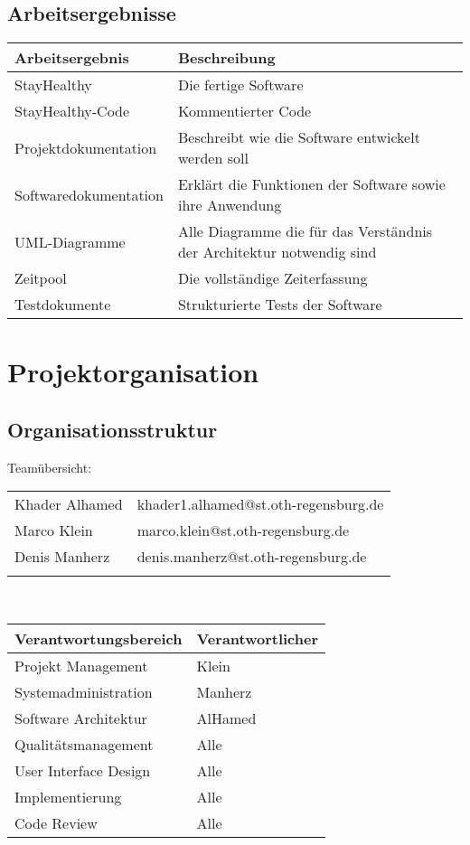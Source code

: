 \documentclass[12pt,a4paper,onecolumn]{article}
\begin{document}
\subsection{Arbeitsergebnisse}
\begin{tabularx}{\textwidth}{ |l|X| } 
 \hline
\textbf{Arbeitsergebnis}  & \textbf{Beschreibung}\\ 
 \hline
 StayHealthy & Die fertige Software\\ 
 \hline
 StayHealthy-Code & Kommentierter Code\\
 \hline
 Projektdokumentation & Beschreibt wie die Software entwickelt werden soll\\
 \hline
 Softwaredokumentation & Erklärt die Funktionen der Software sowie ihre Anwendung\\
 \hline
 UML-Diagramme & Alle Diagramme die für das Verständnis der Architektur notwendig sind \\ 
 \hline
 Zeitpool & Die vollständige Zeiterfassung\\
 \hline
 Testdokumente & Strukturierte Tests der Software\\
 \hline
\end{tabularx}

\section{Projektorganisation}

\subsection{Organisationsstruktur}
Teamübersicht:
\vspace{0.2cm}\\
\begin{tabularx}{\textwidth}{l X}
Khader Alhamed & khader1.alhamed@st.oth-regensburg.de\\
Marco Klein & marco.klein@st.oth-regensburg.de\\
Denis Manherz & denis.manherz@st.oth-regensburg.de\\
\\
\end{tabularx}
\vspace{0.2cm}\\
\begin{tabular}{|l|l|}
\hline
     \textbf{Verantwortungsbereich} & \textbf{Verantwortlicher}\\
     \hline
     Projekt Management & Klein\\
     \hline
     Systemadministration &  Manherz\\
     \hline 
     Software Architektur & AlHamed \\
     \hline
     Qualitätsmanagement & Alle\\
     \hline
     User Interface Design & Alle\\
     \hline
     Implementierung & Alle\\
     \hline
     Code Review & Alle\\
     \hline
\end{tabular}
\end{document}
